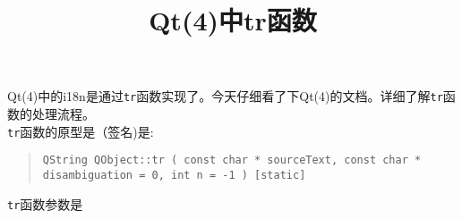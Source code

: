 
\title{Qt(4)中tr函数}

\date{}


\maketitle
Qt(4)中的i18n是通过{\tt{tr}}函数实现了。今天仔细看了下Qt(4)的文档。详细了解{\tt{tr}}函数的处理流程。\\

{\tt{tr}}函数的原型是（签名)是:\\

\begin{quote}
        \texttt{QString QObject::tr ( const char * sourceText, const char *
        disambiguation = 0, int n = -1 ) [static]}
\end{quote}

{\tt{tr}}函数参数是








